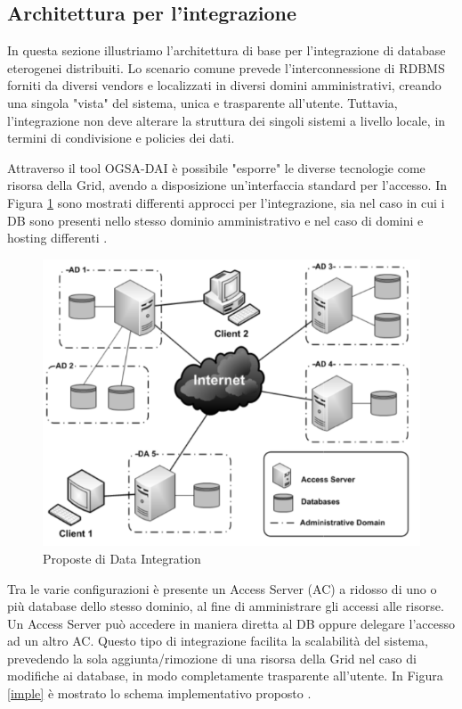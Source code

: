 \documentclass[11pt]{article}
\begin{document}
\subsection{Architettura per l'integrazione}

In questa sezione illustriamo l'architettura di base per l'integrazione di database eterogenei distribuiti. Lo scenario comune prevede l'interconnessione di RDBMS forniti da diversi vendors e localizzati in diversi domini amministrativi, creando una singola "vista" del sistema, unica e trasparente all'utente. Tuttavia, l'integrazione non deve alterare la struttura dei singoli sistemi a livello locale, in termini di condivisione e policies dei dati.

Attraverso il tool OGSA-DAI è possibile "esporre" le diverse tecnologie come risorsa della Grid, avendo a disposizione un'interfaccia standard per l'accesso. In Figura \ref*{propintegr} sono mostrati differenti approcci per l'integrazione, sia nel caso in cui i DB sono presenti nello stesso dominio amministrativo e nel caso di domini e hosting differenti \cite{archgrid}.

\begin{figure}[H]
\centering
\includegraphics[scale=0.50]{images/datainteg.png}
\caption{Proposte di Data Integration \cite{archgrid}}
\label{propintegr}
\end{figure}

Tra le varie configurazioni è presente un Access Server (AC) a ridosso di uno o più database dello stesso dominio, al fine di amministrare gli accessi alle risorse. Un Access Server può accedere in maniera diretta al DB oppure delegare l'accesso ad un altro AC. Questo tipo di integrazione facilita la scalabilità del sistema, prevedendo la sola aggiunta/rimozione di una risorsa della Grid nel caso di modifiche ai database, in modo completamente trasparente all'utente. In Figura \ref{imple} è mostrato lo schema implementativo proposto \cite{archgrid}. 
\end{document}
